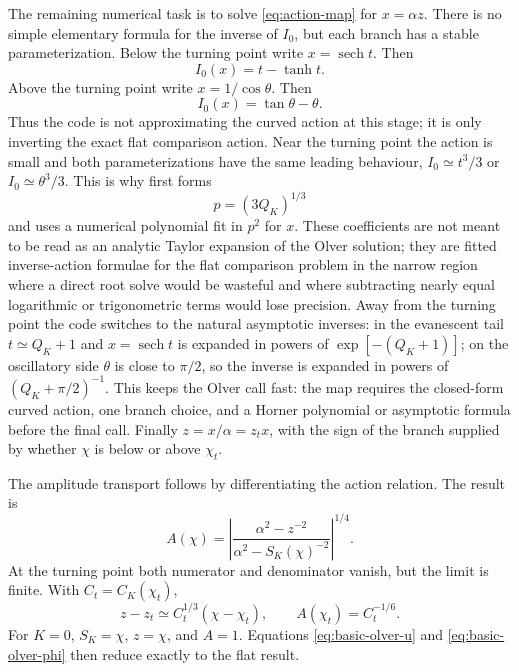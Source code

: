 \documentclass[11pt,a4paper]{article}
\newcommand{\code}[1]{\texttt{\detokenize{#1}}}
\newcommand{\SK}{S_K}
\newcommand{\CK}{C_K}
\newcommand{\sech}{\operatorname{sech}}
\begin{document}
The remaining numerical task is to solve \eqref{eq:action-map} for
\(x=\alpha z\).  There is no simple elementary formula for the inverse of
\(I_0\), but each branch has a stable parameterization.  Below the turning point
write \(x=\sech t\).  Then
\begin{equation}
  I_0(x)=t-\tanh t.
\end{equation}
Above the turning point write \(x=1/\cos\theta\).  Then
\begin{equation}
  I_0(x)=\tan\theta-\theta.
\end{equation}
Thus the code is not approximating the curved action at this stage; it is only
inverting the exact flat comparison action.  Near the turning point the action
is small and both parameterizations have the same leading behaviour,
\(I_0\simeq t^3/3\) or \(I_0\simeq\theta^3/3\).  This is why
\code{invert_flat_action} first forms
\begin{equation}
  p=(3Q_K)^{1/3}
\end{equation}
and uses a numerical polynomial fit in \(p^2\) for \(x\).  These coefficients
are not meant to be read as an analytic Taylor expansion of the Olver
solution; they are fitted inverse-action formulae for the flat comparison
problem in the narrow region where a direct root solve would be wasteful and
where subtracting nearly equal logarithmic or trigonometric terms would lose
precision.  Away from the turning point the code switches to the natural
asymptotic inverses: in the evanescent tail \(t\simeq Q_K+1\) and
\(x=\sech t\) is expanded in powers of \(\exp[-(Q_K+1)]\); on the oscillatory
side \(\theta\) is close to \(\pi/2\), so the inverse is expanded in powers of
\((Q_K+\pi/2)^{-1}\).  This keeps the Olver call fast: the map requires the
closed-form curved action, one branch choice, and a Horner polynomial or
asymptotic formula before the final \code{BJL} call.  Finally
\(z=x/\alpha=z_t x\), with the sign of the branch supplied by whether \(\chi\)
is below or above \(\chi_t\).

The amplitude transport follows by differentiating the action relation.  The result is
\begin{equation}
  A(\chi)=\left|
  \frac{\alpha^2-z^{-2}}{\alpha^2-\SK(\chi)^{-2}}
  \right|^{1/4}.
  \label{eq:amplitude}
\end{equation}
At the turning point both numerator and denominator vanish, but the limit is finite.  With \(C_t=\CK(\chi_t)\),
\begin{equation}
  z-z_t\simeq C_t^{1/3}(\chi-\chi_t),\qquad
  A(\chi_t)=C_t^{-1/6}.
  \label{eq:turning-limit}
\end{equation}
For \(K=0\), \(\SK=\chi\), \(z=\chi\), and \(A=1\).  Equations \eqref{eq:basic-olver-u} and \eqref{eq:basic-olver-phi} then reduce exactly to the flat result.
\end{document}
